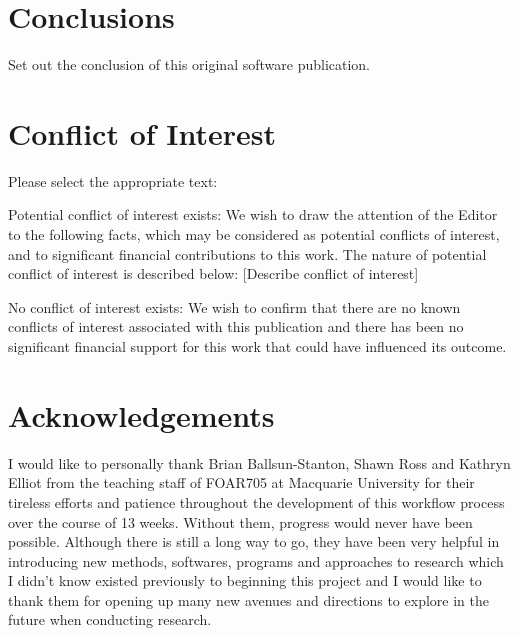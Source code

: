 \documentclass[preprint,12pt, a4paper]{elsarticle}
\begin{document}
\section{Conclusions}
\label{}

Set out the conclusion of this original software publication.

\section{Conflict of Interest}
Please select the appropriate text:

Potential conflict of interest exists:
We wish to draw the attention of the Editor to the following facts, which may be considered as potential conflicts of interest, and to significant financial contributions to this work. The nature of potential conflict of interest is described below: [Describe conflict of interest]

No conflict of interest exists:
We wish to confirm that there are no known conflicts of interest associated with this publication and there has been no significant financial support for this work that could have influenced its outcome.


\section*{Acknowledgements}
\label{}
I would like to personally thank Brian Ballsun-Stanton, Shawn Ross and Kathryn Elliot from the teaching staff of FOAR705 at Macquarie University for their tireless efforts and patience throughout the development of this workflow process over the course of 13 weeks. Without them, progress would never have been possible. Although there is still a long way to go, they have been very helpful in introducing new methods, softwares, programs and approaches to research which I didn't know existed previously to beginning this project and I would like to thank them for opening up many new avenues and directions to explore in the future when conducting research.


\end{document}

